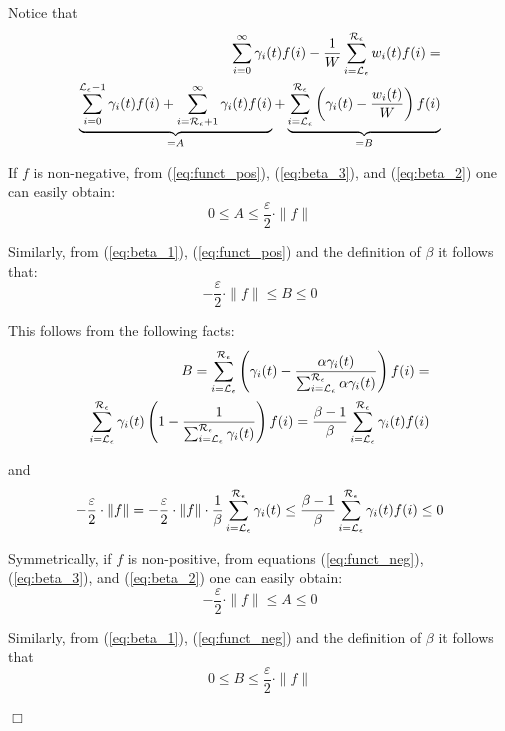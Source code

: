 \documentclass[a4paper,11pt]{article}
\newenvironment{proof}{\trivlist \item[\hskip \labelsep{\bf Proof}]}{\hfill\hbox{$\Box$}\endtrivlist}
\begin{document}
\begin{proof}
		Notice that
		\begin{eqnarray}
			\sum_{i=0}^{\infty} \gamma_{i}(t) f(i) - \frac{1}{W}\sum_{i = \mathcal{L}_{\epsilon}}^{\mathcal{R}_{\epsilon}} w_{i}(t) f(i) = \nonumber \\
			\underbrace{\sum_{i = 0}^{\mathcal{L}_{\epsilon}-1} \gamma_{i}(t) f(i) + \sum_{i = \mathcal{R}_{\epsilon}+1}^{\infty} \gamma_{i}(t) f(i)}_{ = A} +  
			\underbrace{\sum_{i = \mathcal{L}_{\epsilon}}^{\mathcal{R}_{\epsilon}} \left( \gamma_{i}(t) - \frac{w_{i}(t)}{W} \right) f(i)}_{ = B} \nonumber
		\end{eqnarray}
		
		If $f$ is non-negative, from (\ref{eq:funct_pos}), (\ref{eq:beta_3}), and (\ref{eq:beta_2}) one can easily obtain:
		\begin{equation}
			0 \leq A \leq \frac{\varepsilon}{2} \cdot \|f\|
			\label{eq:fg_A_pos}
		\end{equation}
		
		Similarly, from (\ref{eq:beta_1}), (\ref{eq:funct_pos}) and the definition of $\beta$ it follows that:
		\begin{equation}
			- \frac{\varepsilon}{2} \cdot \|f\| \leq B \leq 0
			\label{eq:fg_B_pos}
		\end{equation}
		
		This follows from the following facts:
		\begin{eqnarray}
			B = \sum_{i = \mathcal{L}_{\epsilon}}^{\mathcal{R}_{\epsilon}} \left( \gamma_{i}(t) - \frac{\alpha \gamma_{i}(t) }{\sum^{\mathcal{R}_{\epsilon}}_{i=\mathcal{L}_{\epsilon}} \alpha \gamma_{i}(t)} \right) f(i) = \nonumber \\
			\sum_{i = \mathcal{L}_{\epsilon}}^{\mathcal{R}_{\epsilon}} \gamma_{i}(t) \left( 1 - \frac{1}{\sum^{\mathcal{R}_{\epsilon}}_{i=\mathcal{L}_{\epsilon}} \gamma_{i}(t)} \right) f(i) = \frac{\beta - 1}{\beta} \sum_{i = \mathcal{L}_{\epsilon}}^{\mathcal{R}_{\epsilon}} \gamma_{i}(t)  f(i)\nonumber
		\end{eqnarray}
		
		and
		\begin{equation}
			- \frac{\varepsilon}{2} \cdot \|f\| = - \frac{\varepsilon}{2} \cdot \|f\|\cdot \frac{1}{\beta} \sum_{i = \mathcal{L}_{\epsilon}}^{\mathcal{R}_{\epsilon}} \gamma_{i}(t) \leq \frac{\beta - 1}{\beta} \sum_{i = \mathcal{L}_{\epsilon}}^{\mathcal{R}_{\epsilon}} \gamma_{i}(t)  f(i) \leq 0
		\end{equation}  

		Symmetrically, if $f$ is non-positive, from equations (\ref{eq:funct_neg}), (\ref{eq:beta_3}), and (\ref{eq:beta_2}) one can easily obtain:
		\begin{equation}
			- \frac{\varepsilon}{2} \cdot \|f\| \leq A \leq 0
			\label{eq:fg_A_neg}
		\end{equation}
		
		Similarly, from (\ref{eq:beta_1}), (\ref{eq:funct_neg}) and the definition of $\beta$ it follows that
		\begin{equation}
			0 \leq B \leq \frac{\varepsilon}{2} \cdot \|f\|
			\label{eq:fg_B_neg}
		\end{equation}
		

\end{proof}
\end{document}
